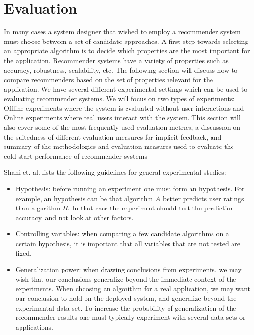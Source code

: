 
\section{Evaluation}





In many cases a system designer that wished to employ a recommender system must choose between a set of candidate approaches. A first step towards selecting an appropriate algorithm is to decide which properties are the most important for the application. Recommender systems have a variety of properties such as accuracy, robustness, scalability, etc. The following section will discuss how to compare recommenders based on the set of properties  relevant for the application. We have several different experimental settings which can be used to evaluating recommender systems. We will focus on two types of experiments: Offline experiments where the system is evaluated without user interactions and Online experiments where real users interact with the system. This section will also cover some of the most frequently used evaluation metrics, a discussion on the suitedness of different evaluation measures for implicit feedback, and summary of the methodologies and evaluation measures used to evaluate the cold-start performance of recommender systems.

Shani et. al. lists the following guidelines for general experimental studies:

\begin{itemize}
\item Hypothesis: before running an experiment one must form an hypothesis. For example, an hypothesis can be that algorithm $A$ better predicts user ratings than algorithm $B$. In that case the experiment should test the prediction accuracy, and not look at other factors.
\item Controlling variables: when comparing a few candidate algorithms on a certain hypothesis, it is important that all variables that are not tested are fixed. 
\item Generalization power: when drawing conclusions from experiments, we may wish that our conclusions generalize beyond the immediate context of the experiments. When choosing an algorithm for a real application, we may want our conclusion to hold on the deployed system, and generalize beyond the experimental data set. To increase the probability of generalization of the recommender results one must typically experiment with several data sets or applications.
\end{itemize}


